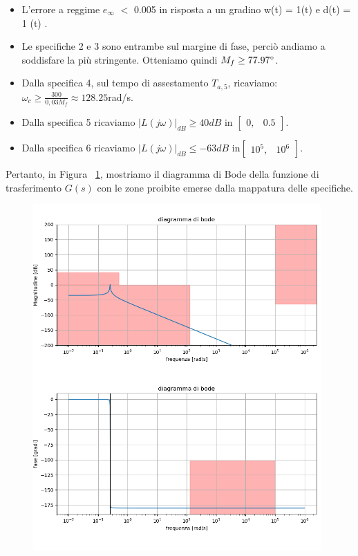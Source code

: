 \documentclass[a4paper, 11pt]{article}
\begin{document}
\begin{itemize}
	\item[1)] L'errore a reggime $e_{\infty}$ $ < $ 0.005 in risposta a un gradino w(t) = 1(t) e d(t) = 1 (t) .\\
	\item[2)] Le specifiche 2 e 3 sono entrambe sul margine di fase, perci\`o andiamo a soddisfare la pi\`u stringente. Otteniamo quindi $M_f\ge77.97\degree$.
	\\
	\item[3)] Dalla specifica 4, sul tempo di assestamento $T_{a,5}$, ricaviamo: $\omega _c \ge \frac{300}{0,03 M_f} \approx 128.25$rad/s.
	\item[4)] Dalla specifica 5 ricaviamo $|L(j\omega)|_{dB} \ge 40dB$ in $\begin{bmatrix}
	    0 , & 0.5
	\end{bmatrix}$.\\
	\item[5)] Dalla specifica 6 ricaviamo $|L(j\omega)|_{dB} \le -63dB$ in$\begin{bmatrix}
	    10^5 , & 10^6
	\end{bmatrix}$.\\
\end{itemize}

Pertanto, in Figura ~\ref{Figura2}, mostriamo il diagramma di Bode della funzione di trasferimento $G(s)$ con le zone proibite emerse dalla mappatura delle specifiche.
\begin{figure}[H]
    \centering
\includegraphics[width=110mm]{figs/bode_G_mapping.png}
    \caption{}
    \label{Figura2}
\end{figure}
\end{document}
